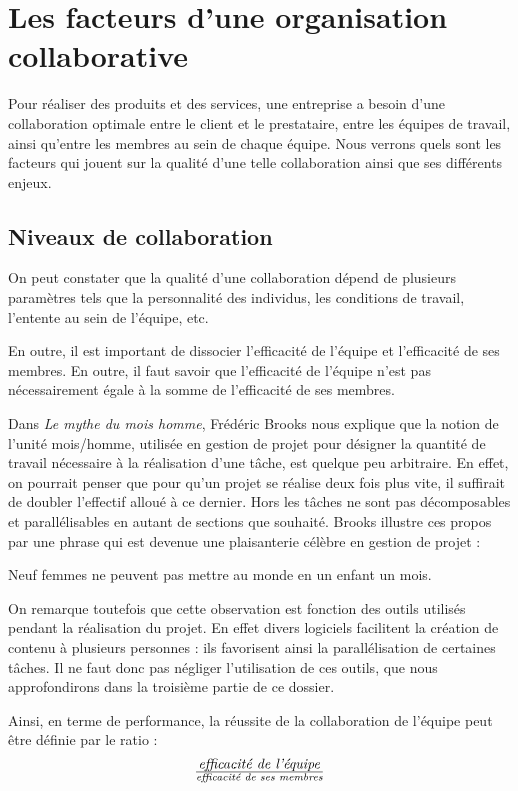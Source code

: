\chapter{Les facteurs d'une organisation collaborative}

Pour réaliser des produits et des services, une entreprise a besoin d'une collaboration optimale entre le client et le prestataire, entre les équipes de travail, ainsi qu'entre les membres au sein de chaque équipe. Nous verrons quels sont les facteurs qui jouent sur la qualité d'une telle collaboration ainsi que ses différents enjeux.

\section{Niveaux de collaboration}

On peut constater que la qualité d'une collaboration dépend de plusieurs paramètres tels que la personnalité des individus, les conditions de travail, l'entente au sein de l'équipe, etc.

En outre, il est important de dissocier l'efficacité de l'équipe et l'efficacité de ses membres. En outre, il faut savoir que l'efficacité de l'équipe n'est pas nécessairement égale à la somme de l'efficacité de ses membres.

Dans \textit{Le mythe du mois homme}, Frédéric Brooks nous explique que la notion de l'unité mois/homme, utilisée en gestion de projet pour désigner la quantité de travail nécessaire à la réalisation d'une tâche, est quelque peu arbitraire. En effet, on pourrait penser que pour qu'un projet se réalise deux fois plus vite, il suffirait de doubler l'effectif alloué à ce dernier. Hors les tâches ne sont pas décomposables et parallélisables en autant de sections que souhaité. Brooks illustre ces propos par une phrase qui est devenue une plaisanterie célèbre en gestion de projet : \begin{Quote}Neuf femmes ne peuvent pas mettre au monde en un enfant un mois.\end{Quote}

On remarque toutefois que cette observation est fonction des outils utilisés pendant la réalisation du projet. En effet divers logiciels facilitent la création de contenu à plusieurs personnes : ils favorisent ainsi la parallélisation de certaines tâches. Il ne faut donc pas négliger l'utilisation de ces outils, que nous approfondirons dans la troisième partie de ce dossier.

Ainsi, en terme de performance, la réussite de la collaboration de l'équipe peut être définie par le ratio : \[\text{\textit{efficacité de l'équipe}} \over \text{\textit{efficacité de ses membres}}\]

